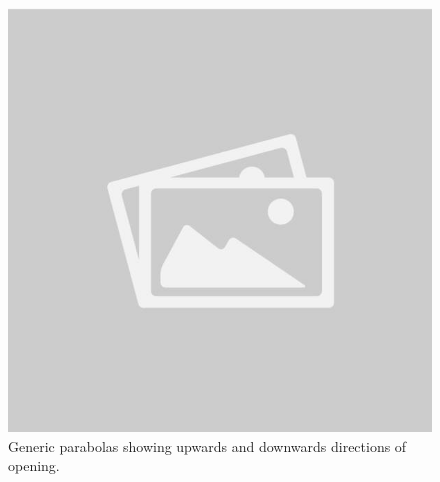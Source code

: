 \documentclass{article}
\begin{document}
\begin{definitionbox}
\begin{illustrationbox}
\begin{figure}[H]
\begin{minipage}{0.45\textwidth}
                \includegraphics[width=\textwidth]{sample_image2.jpg}
                \caption{Generic parabolas showing upwards and downwards directions of opening.}
                \label{fig:parabola_generic}
            \end{minipage}
        \end{figure}
    \end{illustrationbox}    
\end{definitionbox}
\end{document}

